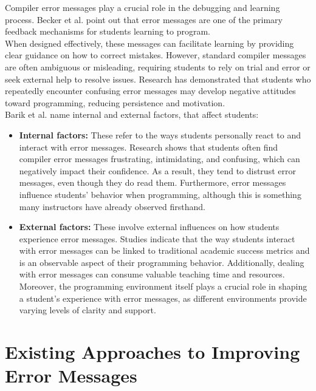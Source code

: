 Compiler error messages play a crucial role in the debugging and learning process.
Becker et al. point out that error messages are one of the primary feedback mechanisms for students learning to program.\\[5pt]
When designed effectively, these messages can facilitate learning by providing clear guidance on how to correct mistakes.
However, standard compiler messages are often ambiguous or misleading, requiring students to rely on trial and error or seek external help to resolve issues.
Research has demonstrated that students who repeatedly encounter confusing error messages may develop negative attitudes toward programming, reducing persistence and motivation.\\[5pt]
Barik et al. \cite{barik} name internal and external factors, that affect students:
\begin{itemize}[nosep]
    \item \textbf{Internal factors:}
        These refer to the ways students personally react to and interact with error messages.
        Research shows that students often find compiler error messages frustrating, intimidating, and confusing, which can negatively impact their confidence.
        As a result, they tend to distrust error messages, even though they do read them.
        Furthermore, error messages influence students' behavior when programming, although this is something many instructors have already observed firsthand.
    \item \textbf{External factors:}
        These involve external influences on how students experience error messages.
        Studies indicate that the way students interact with error messages can be linked to traditional academic success metrics and is an observable aspect of their programming behavior.
        Additionally, dealing with error messages can consume valuable teaching time and resources.
        Moreover, the programming environment itself plays a crucial role in shaping a student's experience with error messages, as different environments provide varying levels of clarity and support.
\end{itemize}



\section{Existing Approaches to Improving Error Messages} %


